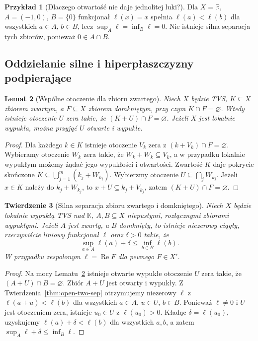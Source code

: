 \documentclass[11pt,a4paper]{article}
\numberwithin{equation}{section}
\theoremstyle{plain}
\newtheorem{twierdzenie}{Twierdzenie}[section]
\newtheorem{lemat}[twierdzenie]{Lemat}
\theoremstyle{definition}
\newtheorem{przyklad}[twierdzenie]{Przykład}
\theoremstyle{remark}
\newcommand{\R}{\mathbb R}
\newcommand{\K}{\mathbb K}
\begin{document}
\begin{przyklad}[Dlaczego otwartość nie daje jednolitej luki?]
Dla $X=\R$, $A=(-1,0)$, $B=\{0\}$ funkcjonał
$\ell(x)=x$ spełnia $\ell(a)<\ell(b)$ dla wszystkich
$a\in A$, $b\in B$, lecz $\sup_A\ell=\inf_B\ell=0$.
Nie istnieje silna separacja tych zbiorów, ponieważ
$0\in\overline A\cap B$.
\end{przyklad}

\subsection{Oddzielanie silne i hiperpłaszczyzny podpierające}

\begin{lemat}[Wspólne otoczenie dla zbioru zwartego]
\label{lem:compact-neighborhood}
Niech $X$ będzie TVS, $K\subseteq X$ zbiorem zwartym,
a $F\subseteq X$ zbiorem domkniętym, przy czym $K\cap F=\varnothing$.
Wtedy istnieje otoczenie $U$ zera takie, że
$(K+U)\cap F=\varnothing$. Jeżeli $X$ jest lokalnie wypukła,
można przyjąć $U$ otwarte i wypukłe.
\end{lemat}
\begin{proof}
Dla każdego $k\in K$ istnieje otoczenie $V_k$ zera
z $(k+V_k)\cap F=\varnothing$. Wybieramy otoczenie
$W_k$ zera takie, że $W_k+W_k\subseteq V_k$,
a w przypadku lokalnie wypukłym możemy żądać
jego wypukłości i otwartości. Zwartość $K$ daje
pokrycie skończone $K\subseteq\bigcup_{j=1}^m(k_j+W_{k_j})$.
Wybierzmy otoczenie $U\subseteq\bigcap_j W_{k_j}$.
Jeżeli $x\in K$ należy do $k_j+W_{k_j}$, to
$x+U\subseteq k_j+V_{k_j}$, zatem $(K+U)\cap F=\varnothing$.
\end{proof}

\begin{twierdzenie}[Silna separacja zbioru zwartego i domkniętego]
\label{thm:strong-separation}
Niech $X$ będzie lokalnie wypukłą TVS nad $\K$,
$A,B\subseteq X$ niepustymi, rozłącznymi zbiorami wypukłymi.
Jeżeli $A$ jest zwarty, a $B$ domknięty, to istnieje
niezerowy ciągły, rzeczywiście liniowy funkcjonał $\ell$
oraz $\delta>0$ takie, że
\[
\sup_{a\in A}\ell(a)+\delta\le\inf_{b\in B}\ell(b).
\]
W przypadku zespolonym $\ell=\operatorname{Re}F$ dla pewnego $F\in X'$.
\end{twierdzenie}
\begin{proof}
Na mocy Lematu~\ref{lem:compact-neighborhood} istnieje
otwarte wypukłe otoczenie $U$ zera takie, że
$(A+U)\cap B=\varnothing$. Zbiór $A+U$ jest otwarty
i wypukły. Z Twierdzenia~\ref{thm:open-two-sep}
otrzymujemy niezerowy $\ell$ z
$\ell(a+u)<\ell(b)$ dla wszystkich
$a\in A$, $u\in U$, $b\in B$. Ponieważ $\ell\ne0$
i $U$ jest otoczeniem zera, istnieje $u_0\in U$
z $\ell(u_0)>0$. Kładąc $\delta=\ell(u_0)$, uzyskujemy
$\ell(a)+\delta<\ell(b)$ dla wszystkich $a,b$,
a zatem $\sup_A\ell+\delta\le\inf_B\ell$.
\end{proof}
\end{document}
